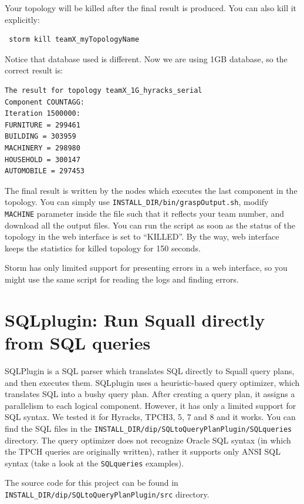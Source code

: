 \documentclass[a4paper,10pt]{article}
\begin{document}
Your topology will be killed after the final result is produced. You can also kill it explicitly:
\begin{verbatim}
 storm kill teamX_myTopologyName
\end{verbatim}

Notice that database used is different. Now we are using 1GB database, so the correct result is:
\begin{verbatim}
The result for topology teamX_1G_hyracks_serial
Component COUNTAGG:
Iteration 1500000:
FURNITURE = 299461
BUILDING = 303959
MACHINERY = 298980
HOUSEHOLD = 300147
AUTOMOBILE = 297453
\end{verbatim}

The final result is written by the nodes which executes the last component in the topology. You can simply use \verb#INSTALL_DIR/bin/graspOutput.sh#, modify \verb#MACHINE# parameter inside the file such that it reflects your team number, and download all the output files. You can run the script as soon as the status of the topology in the web interface is set to ``KILLED''. By the way, web interface keeps the statistics for killed topology for 150 seconds.

Storm has only limited support for presenting errors in a web interface, so you might use the same script for reading the logs and finding errors.

\section{SQLplugin: Run Squall directly from SQL queries}
\vspace{2mm}
SQLPlugin is a SQL parser which translates SQL directly to Squall query plans, and then executes them. SQLplugin uses a heuristic-based query optimizer, which translates SQL into a bushy query plan. After creating a query plan, it assigns a parallelism to each logical component. However, it has only a limited support for SQL syntax. We tested it for Hyracks, TPCH3, 5, 7 and 8 and it works. You can find the SQL files in the \verb|INSTALL_DIR/dip/SQLtoQueryPlanPlugin/SQLqueries| directory. The query optimizer does not recognize Oracle SQL syntax (in which the TPCH queries are originally written), rather it supports only ANSI SQL syntax (take a look at the \verb|SQLqueries| examples).

The source code for this project can be found in \\ \verb|INSTALL_DIR/dip/SQLtoQueryPlanPlugin/src| directory.
\end{document}

